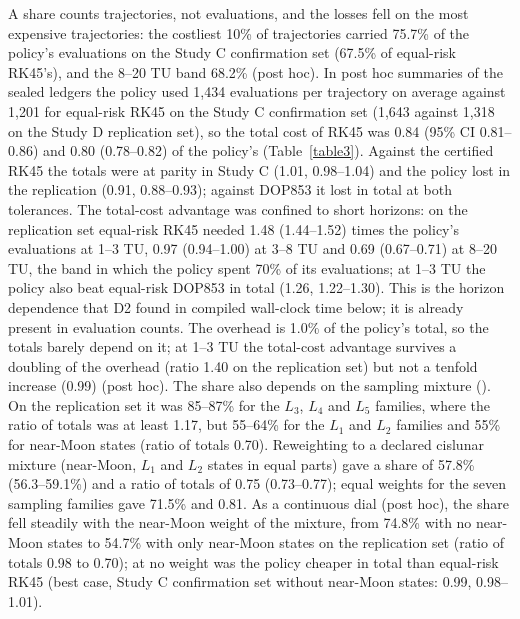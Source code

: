\documentclass[10pt,letterpaper]{article}
\begin{document}
A share counts trajectories, not evaluations, and the losses fell on the most expensive trajectories: the costliest 10\% of trajectories carried 75.7\% of the policy's evaluations on the Study C confirmation set (67.5\% of equal-risk RK45's), and the 8--20 TU band 68.2\% (post hoc). In post hoc summaries of the sealed ledgers the policy used 1,434 evaluations per trajectory on average against 1,201 for equal-risk RK45 on the Study C confirmation set (1,643 against 1,318 on the Study D replication set), so the total cost of RK45 was 0.84 (95\% CI 0.81--0.86) and 0.80 (0.78--0.82) of the policy's (Table~\ref{table3}). Against the certified RK45 the totals were at parity in Study C (1.01, 0.98--1.04) and the policy lost in the replication (0.91, 0.88--0.93); against DOP853 it lost in total at both tolerances. The total-cost advantage was confined to short horizons: on the replication set equal-risk RK45 needed 1.48 (1.44--1.52) times the policy's evaluations at 1--3 TU, 0.97 (0.94--1.00) at 3--8 TU and 0.69 (0.67--0.71) at 8--20 TU, the band in which the policy spent 70\% of its evaluations; at 1--3 TU the policy also beat equal-risk DOP853 in total (1.26, 1.22--1.30). This is the horizon dependence that D2 found in compiled wall-clock time below; it is already present in evaluation counts. The overhead is 1.0\% of the policy's total, so the totals barely depend on it; at 1--3 TU the total-cost advantage survives a doubling of the overhead (ratio 1.40 on the replication set) but not a tenfold increase (0.99) (post hoc). The share also depends on the sampling mixture (). On the replication set it was 85--87\% for the $L_3$, $L_4$ and $L_5$ families, where the ratio of totals was at least 1.17, but 55--64\% for the $L_1$ and $L_2$ families and 55\% for near-Moon states (ratio of totals 0.70). Reweighting to a declared cislunar mixture (near-Moon, $L_1$ and $L_2$ states in equal parts) gave a share of 57.8\% (56.3--59.1\%) and a ratio of totals of 0.75 (0.73--0.77); equal weights for the seven sampling families gave 71.5\% and 0.81. As a continuous dial (post hoc), the share fell steadily with the near-Moon weight of the mixture, from 74.8\% with no near-Moon states to 54.7\% with only near-Moon states on the replication set (ratio of totals 0.98 to 0.70); at no weight was the policy cheaper in total than equal-risk RK45 (best case, Study C confirmation set without near-Moon states: 0.99, 0.98--1.01).
\end{document}
